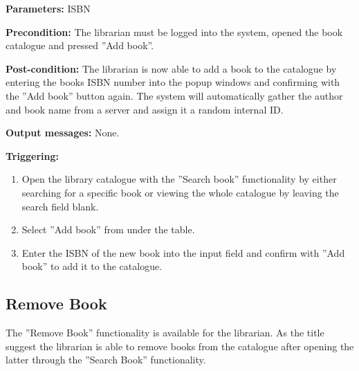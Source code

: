 \begin{description}

\item \textbf{Parameters:} ISBN

\item \textbf{Precondition:} The librarian must be logged into the system,
opened the book catalogue and pressed ''Add book''.

\item \textbf{Post-condition:} The librarian is now able to add a book to the
catalogue by entering the books ISBN number into the popup windows and
confirming with the ''Add book'' button again. The system will automatically
gather the author and book name from a server and assign it a random internal
ID.

\item \textbf{Output messages:} None.

\item \textbf{Triggering:}
\begin{enumerate}
\item Open the library catalogue with the ''Search book'' functionality by
either searching for a specific book or viewing the whole catalogue by leaving
the search field blank.
\item Select ''Add book'' from under the table.
\item Enter the ISBN of the new book into the input field and confirm with ''Add
book'' to add it to the catalogue.
\end{enumerate}

\end{description}

\subsection{Remove Book}

The ''Remove Book'' functionality is available for the librarian. As the title
suggest the librarian is able to remove books from the catalogue after opening
the latter through the ''Search Book'' functionality.

